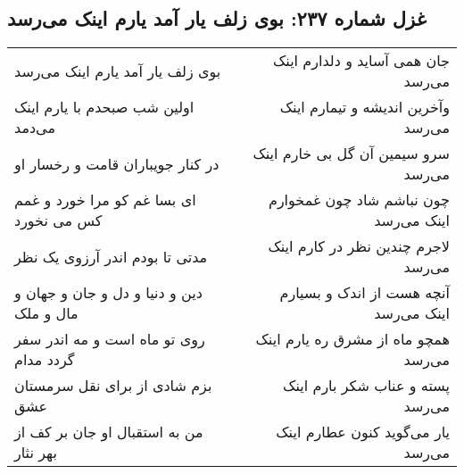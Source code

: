 \begin{center}
\section*{غزل شماره ۲۳۷: بوی زلف یار آمد یارم اینک می‌رسد}
\label{sec:237}
\begin{longtable}{l p{0.5cm} r}
بوی زلف یار آمد یارم اینک می‌رسد
&&
جان همی آساید و دلدارم اینک می‌رسد
\\
اولین شب صبحدم با یارم اینک می‌دمد
&&
وآخرین اندیشه و تیمارم اینک می‌رسد
\\
در کنار جویباران قامت و رخسار او
&&
سرو سیمین آن گل بی خارم اینک می‌رسد
\\
ای بسا غم کو مرا خورد و غمم کس می نخورد
&&
چون نباشم شاد چون غمخوارم اینک می‌رسد
\\
مدتی تا بودم اندر آرزوی یک نظر
&&
لاجرم چندین نظر در کارم اینک می‌رسد
\\
دین و دنیا و دل و جان و جهان و مال و ملک
&&
آنچه هست از اندک و بسیارم اینک می‌رسد
\\
روی تو ماه است و مه اندر سفر گردد مدام
&&
همچو ماه از مشرق ره یارم اینک می‌رسد
\\
بزم شادی از برای نقل سرمستان عشق
&&
پسته و عناب شکر بارم اینک می‌رسد
\\
من به استقبال او جان بر کف از بهر نثار
&&
یار می‌گوید کنون عطارم اینک می‌رسد
\\
\end{longtable}
\end{center}
